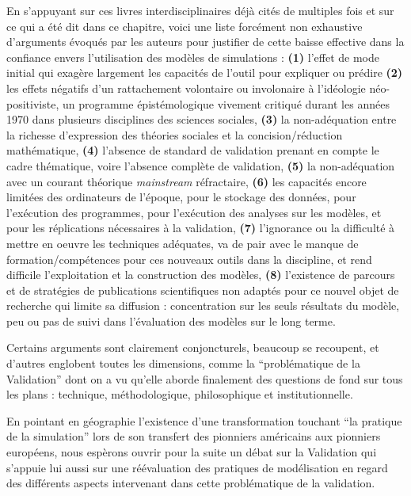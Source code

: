 En s'appuyant sur ces livres interdisciplinaires déjà cités de multiples fois \autocite{Dutton1971,Guetzkow1962, Guetzkow1972} et sur ce qui a été dit dans ce chapitre, voici une liste forcément non exhaustive d'arguments évoqués par les auteurs pour justifier de cette baisse effective dans la confiance envers l'utilisation des modèles de simulations : \textbf{(1)} l'effet de mode initial qui exagère largement les capacités de l'outil pour expliquer ou prédire \textbf{(2)} les effets négatifs d'un rattachement volontaire ou involonaire à l'idéologie néo-positiviste, un programme épistémologique vivement critiqué durant les années 1970 dans plusieurs disciplines des sciences sociales, \textbf{(3)} la non-adéquation entre la richesse d'expression des théories sociales et la concision/réduction mathématique, \textbf{(4)} l'absence de standard de validation prenant en compte le cadre thématique, voire l'absence complète de validation, \textbf{(5)} la non-adéquation avec un courant théorique \textit{mainstream} réfractaire, \textbf{(6)} les capacités encore limitées des ordinateurs de l'époque, pour le stockage des données, pour l'exécution des programmes, pour l'exécution des analyses sur les modèles, et pour les réplications nécessaires à la validation, \textbf{(7)} l'ignorance ou la difficulté à mettre en oeuvre les techniques adéquates, va de pair avec le manque de formation/compétences pour ces nouveaux outils dans la discipline, et rend difficile l'exploitation et la construction des modèles, \textbf{(8)} l'existence de parcours et de stratégies de publications scientifiques non adaptés pour ce nouvel objet de recherche qui limite sa diffusion : concentration sur les seuls résultats du modèle, peu ou pas de suivi dans l'évaluation des modèles sur le long terme.

Certains arguments sont clairement conjoncturels, beaucoup se recoupent, et d'autres englobent toutes les dimensions, comme la \enquote{problématique de la Validation} dont on a vu qu'elle aborde finalement des questions de fond sur tous les plans : technique, méthodologique, philosophique et institutionnelle. %

En pointant en géographie l'existence d'une transformation touchant \enquote{la pratique de la simulation} lors de son transfert des pionniers américains aux pionniers européens, nous espèrons ouvrir pour la suite un débat sur la Validation qui s'appuie lui aussi sur une réévaluation des pratiques de modélisation en regard des différents aspects intervenant dans cette problématique de la validation. %

